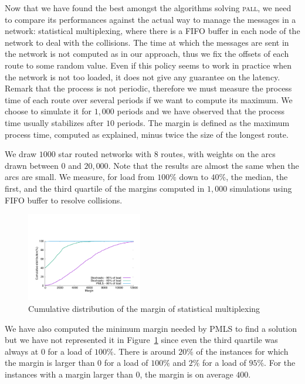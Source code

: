 \documentclass[10pt, conference, letterpaper]{IEEEtran}
\newcommand\pall{\textsc{pall}\xspace}
\begin{document}
     
     
     Now that we have found the best amongst the algorithms solving \pall, we need to compare its performances against the actual way to manage the messages in a network:  statistical multiplexing, where there is a FIFO buffer in each node of the network to deal with the collisions. The time at which the messages are sent in the network is not computed as in our approach, thus we fix the offsets of each route to some random value.
     Even if this policy seems to work in practice when the network is not too loaded, it does not give any guarantee on the latency. Remark that the process is not periodic, therefore we must measure the process time of each route over several periods if we want to compute its maximum. We choose to simulate it for $1,000$ periods and we have observed that the process time usually stabilizes after $10$ periods. The margin is defined as the maximum process time, computed as explained, minus twice the size of the longest route. 
	    
     
     We draw $1000$ star routed networks with $8$ routes, with weights on the arcs drawn between $0$ and $20,000$. Note that the results are almost the same when the arcs are small. We measure, for load from $100\%$ down to $40\%$, the median, the first, and the third quartile of the margins computed in $1,000$ simulations using FIFO buffer to resolve collisions.

      
    \begin{figure}
       \begin{center}
      \includegraphics[width = 0.45\textwidth]{stochastic.pdf}
      \end{center}

      \caption{Cumulative distribution of the margin of statistical multiplexing}
      \label{fig:sto}
     \end{figure}    
     
     We have also computed the minimum margin needed by PMLS to find a solution but we have not represented it in Figure~\ref{fig:sto} since even the third quartile was always at $0$ for a load of $100\%$. There is around $20\%$ of the instances for which the margin is larger than $0$ for a load of $100\%$ and $2\%$ for a load of $95\%$. For the instances with a margin larger than $0$, the margin is on average $400$.
     
\end{document}

